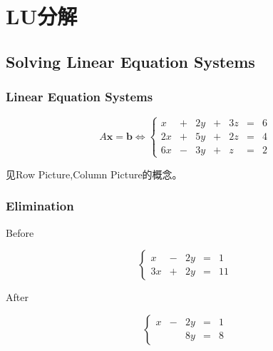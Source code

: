 \chapter{LU分解}

\section{Solving Linear Equation Systems}

\subsection{Linear Equation Systems}
\begin{example}
    \begin{equation}
         A\boldsymbol{x} =\boldsymbol{b} \Leftrightarrow { \left\{\begin{matrix}
        x & + & 2y & + & 3z & = & 6\\
        2x & + & 5y & + & 2z & = & 4\\
        6x & - & 3y & + & z & = & 2
        \end{matrix}\right. }
         \end{equation}
\end{example}

见Row Picture,Column Picture的概念。

\subsection{Elimination}

\begin{example}[Elimination]
    Before

        \begin{equation} \left\{\begin{matrix}
        x & - & 2y & = & 1\\
        3x & + & 2y & = & 11
        \end{matrix}\right. \end{equation}
        
        
   
    After
    
    \begin{equation} \left\{\begin{matrix}
        x & - & 2y & = & 1\\
         &  & 8y & = & 8
        \end{matrix}\right. \end{equation}
    

\end{example}

